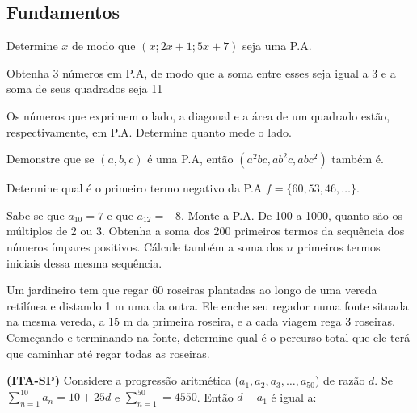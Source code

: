 \documentclass[12pt, addpoints]{exam}
\begin{document}
\begin{center}
\end{center}

\subsection*{Fundamentos}

\begin{questions}
  \question [\half] Determine $x$ de modo que $(x ; 2x + 1 ; 5x + 7)$ seja uma P.A.

  \question [\half] Obtenha 3 números em P.A, de modo que a soma entre esses seja igual a 3 e a soma de seus quadrados seja 11

  \question [\half] Os números que exprimem o lado, a diagonal e a área de um quadrado estão, respectivamente, em P.A. Determine quanto mede o lado.

  \question [1 \half] Demonstre que se $(a, b, c)$ é uma P.A, então $(a^{2}bc, ab^{2}c, abc^{2})$ também é.

  \question[1] Determine qual é o primeiro termo negativo da P.A $f = \{60, 53, 46, \dots\}$.

  \question [\half] Sabe-se que $a_{10} = 7$ e que $a_{12} = -8$. Monte a P.A.
  \question [\half] De 100 a 1000, quanto são os múltiplos de 2 ou 3.
  \question [1] Obtenha a soma dos 200 primeiros termos da sequência dos números ímpares positivos. Cálcule também a soma dos $n$ primeiros termos iniciais dessa mesma sequência.

  \question[1] Um jardineiro tem que regar 60 roseiras plantadas ao longo de uma vereda retilínea e distando 1 m uma da outra. Ele enche seu regador numa fonte situada na mesma vereda, a 15 m da primeira roseira, e a cada viagem rega 3 roseiras. Começando e terminando na fonte, determine qual é o percurso total que ele terá que caminhar até regar todas as roseiras.

  \question[3] \textbf{(ITA-SP)} Considere a progressão aritmética ($a_{1}, a_{2}, a_{3}, \dots, a_{50}$) de razão $d$. Se $\displaystyle \sum_{n = 1}^{10} a_{n} = 10 + 25d$ e $\displaystyle \sum_{n = 1}^{50} = 4550$. Então $d - a_{1}$ é igual a:
  \vspace{0.2cm}
\end{questions}
\end{document}
